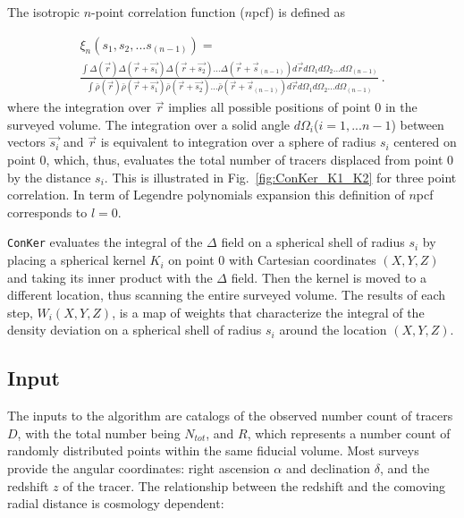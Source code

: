 \documentclass{aa}
\begin{document}
The isotropic $n$-point correlation function ($n$pcf) is defined as

\begin{multline}
\xi_n(s_1,s_2,...s_{(n-1)}) = \\ 
\frac{\int \Delta(\vec{r}) \Delta(\vec{r}+\vec{s_1}) \Delta(\vec{r}+\vec{s_2}) ...\Delta(\vec{r}+\vec{s}_{(n-1)}) d\vec{r} d\Omega_1 d\Omega_2... d\Omega_{(n-1)}} {\int \bar{\rho}(\vec{r}) \bar{\rho}(\vec{r}+\vec{s_1}) \bar{\rho}(\vec{r}+\vec{s_2}) ...\bar{\rho}(\vec{r}+\vec{s}_{(n-1)}) d\vec{r} d\Omega_1 d\Omega_2... d\Omega_{(n-1)}} \ . 
\label{eq:corr_theory}
\end{multline}
%
where the integration over $\vec{r}$ implies all possible positions of point $0$ in the surveyed volume.  The integration over a solid angle $d\Omega_i$($i=1,...n-1$) between vectors $\vec{s_i}$ and $\vec{r}$ is equivalent to integration over a sphere of  radius $s_i$ centered on point $0$, which, thus, evaluates the total number of tracers displaced from point $0$ by the distance $s_i$. This is illustrated in Fig.~\ref{fig:ConKer_K1_K2} for three point correlation. In term of Legendre polynomials expansion this definition of $n$pcf corresponds to $l=0$.

{\tt ConKer} evaluates the integral of the $\Delta$ field on a spherical shell of radius $s_i$  by placing a spherical kernel $K_i$ on point $0$ with Cartesian coordinates $(X,Y,Z)$ and taking its inner product with the $\Delta$ field. Then the kernel is moved to a different location, thus scanning the entire surveyed volume. The results of each step, $W_i(X,Y,Z)$, is a map of weights that characterize the integral of the density deviation on a spherical shell of radius $s_i$ around the location $(X,Y,Z)$. 

\subsection{Input} 
\label{subsec:input1}

The inputs to the algorithm are catalogs of the observed number count of tracers $D$, with the total number being $N_{tot}$, and $R$, which represents a number count of randomly distributed points within the same fiducial volume. Most surveys provide the angular coordinates: right ascension $\alpha$ and declination $\delta$, and the redshift $z$ of the tracer. The relationship between the redshift and the comoving radial distance is cosmology dependent:
\end{document}

